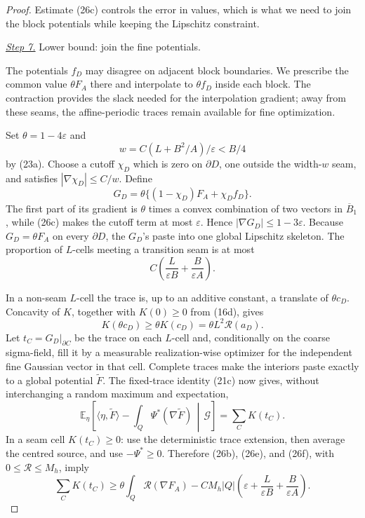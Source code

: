 \documentclass{smfart}
\theoremstyle{definition}
\newcommand{\1}{\mathbf 1}
\begin{document}
\begin{proof}
Estimate (26c) controls the error in values, which is what we need to
join the block potentials while keeping the Lipschitz constraint.

\smallskip\noindent
\underline{\textit{Step 7.}} Lower bound: join the fine potentials.

The potentials $f_D$ may disagree on adjacent block boundaries.
We prescribe the common value $\theta F_A$ there and interpolate to
$\theta f_D$ inside each block.  The contraction provides the slack
needed for the interpolation gradient; away from these seams, the
affine-periodic traces remain available for fine optimization.

Set $\theta=1-4\varepsilon$ and
\begin{equation*}
w=C(L+B^2/A)/\varepsilon<B/4
\end{equation*}
by (23a).  Choose a cutoff $\chi_ D$ which is zero on $\partial D$,
one outside the width-$w$ seam, and satisfies
$|\nabla\chi_ D|\leq C/w$.  Define
\begin{equation}
G_ D=\theta\{(1-\chi_ D)F_ A+\chi_ D f_ D\}.
\tag{26d}
\end{equation}
The first part of its gradient is $\theta$ times a convex combination
of two vectors in $\overline B_ 1$, while (26c) makes the cutoff term
at most $\varepsilon$.  Hence $|\nabla G_ D|\leq1-3\varepsilon$.
Because $G_ D=\theta F_ A$ on every $\partial D$, the $G_ D$'s paste
into one global Lipschitz skeleton.  The proportion of $L$-cells
meeting a transition seam is at most
\begin{equation}
C\left(\frac{L}{\varepsilon B}
+\frac{B}{\varepsilon A}\right).
\tag{26e}
\end{equation}

In a non-seam $L$-cell the trace is, up to an additive constant, a
translate of $\theta c_ D$.  Concavity of $K$, together with
$K(0)\geq0$ from (16d), gives
\begin{equation}
K(\theta c_ D)\geq\theta K(c_ D)=\theta L^2\mathcal R(a_ D).
\tag{26f}
\end{equation}
Let $t_ C=G_ D|_ {\partial C}$ be the trace on each $L$-cell and,
conditionally on the coarse sigma-field, fill it by a measurable
realization-wise optimizer for the independent fine Gaussian vector in
that cell.  Complete traces make the interiors paste exactly to a global
potential $\widetilde F$.  The fixed-trace identity (21c) now gives,
without interchanging a random maximum and expectation,
\begin{equation}
\mathbb E_ \eta\!\left[
\langle\eta,\widetilde F\rangle-
\int_ Q\Psi^*(\nabla\widetilde F)\,\middle|\,\mathscr G\right]
=\sum_ CK(t_ C).
\tag{26g}
\end{equation}
In a seam cell $K(t_ C)\geq0$: use the deterministic trace extension,
then average the centred source, and use $-\Psi^*\geq0$.  Therefore
(26b), (26e), and (26f), with $0\leq \mathcal R\leq M_ h$, imply
\begin{equation}
\sum_ CK(t_ C)\geq\theta\int_ Q\mathcal R(\nabla F_ A)
-CM_ h|Q|\left(\varepsilon+\frac{L}{\varepsilon B}
+\frac{B}{\varepsilon A}\right).
\tag{26h}
\end{equation}


\end{proof}
\end{document}
